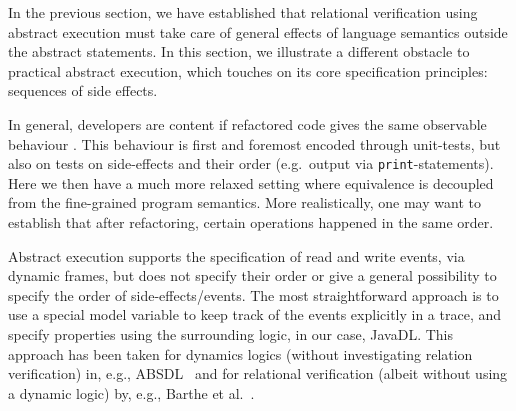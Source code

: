 In the previous section, we have established that relational verification using abstract execution
must take care of general effects of language semantics outside the abstract statements.
In this section, we illustrate a different obstacle to practical abstract execution, which touches on its core specification principles: sequences of side effects.

In general, developers are content if refactored code gives the same observable behaviour \cite{needed}.
This behaviour is first and foremost encoded through unit-tests, but also on tests on side-effects and their order (e.g.\ output via \texttt{print}-statements).
Here we then have a much more relaxed setting where equivalence is decoupled from the fine-grained program semantics.
More realistically, one may want to establish that after refactoring, certain operations happened in the same order.

Abstract execution supports the specification of read and write events, via dynamic frames, but does not specify their order or give a general possibility to
specify the order of side-effects/events. The most straightforward approach is to use a special model variable to keep track of the events explicitly in a trace, 
and specify properties using the surrounding logic, in our case, JavaDL. This approach has been taken for dynamics logics (without investigating relation verification) in, e.g., ABSDL~\cite{DBLP:journals/jlp/DinO14} and for relational verification (albeit without using a dynamic logic) by, e.g., Barthe et al.~\cite{DBLP:conf/fmcad/BartheEGGKM19}.

\begin{example}
\end{example}

